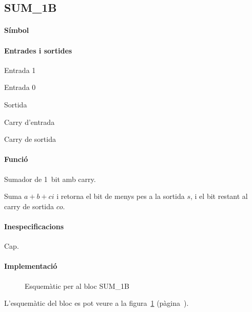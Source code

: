 \subsection{\label{sub:\projectname-SUM_1B} \textsf{SUM\_1B}}

\paragraph{Símbol}
\begin{center}  \end{center}

\paragraph{Entrades i sortides}

\begin{where}
\item[\nodenamebit{a}] Entrada 1
\item[\nodenamebit{b}] Entrada 0
\item[\nodenamebit{s}] Sortida
\item[\nodenamebit{ci}] Carry d'entrada
\item[\nodenamebit{co}] Carry de sortida
\end{where}

\paragraph{Funció}

Sumador de 1~bit amb carry.

Suma $a + b + ci$ i retorna el bit de menys pes a la sortida $s$, i el bit restant
al carry de sortida $co$.

\paragraph{Inespecificacions}

Cap.

\paragraph{Implementació}

\begin{figure}[b]
  \begin{center}
  \end{center}
  \caption{\label{fig:\projectname-SUM_1B} Esquemàtic per al bloc \textsf{SUM\_1B}}
\end{figure}

L'esquemàtic del bloc es pot veure a la figura~\ref{fig:\projectname-SUM_1B} (pàgina~\pageref{fig:\projectname-SUM_1B}).



\vspace{1cm}
